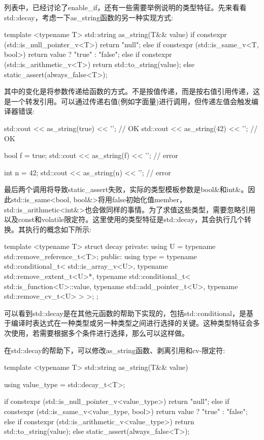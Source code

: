 列表中，已经讨论了enable\_if，还有一些需要举例说明的类型特征。先来看看std::decay，考虑一下as\_string函数的另一种实现方式:

\begin{cpp}
template <typename T>
std::string as_string(T&& value)
{
	if constexpr (std::is_null_pointer_v<T>)
		return "null";
	else if constexpr (std::is_same_v<T, bool>)
		return value ? "true" : "false";
	else if constexpr (std::is_arithmetic_v<T>)
		return std::to_string(value);
	else
		static_assert(always_false<T>);
}
\end{cpp}

其中的变化是将参数传递给函数的方式。不是按值传递，而是按右值引用传递，这是一个转发引用。可以通过传递右值(例如字面量)进行调用，但传递左值会触发编译器错误:

\begin{cpp}
std::cout << as_string(true) << '\n'; // OK
std::cout << as_string(42) << '\n'; // OK

bool f = true;
std::cout << as_string(f) << '\n'; // error

int n = 42;
std::cout << as_string(n) << '\n'; // error
\end{cpp}

最后两个调用将导致static\_assert失败，实际的类型模板参数是bool\&和int\&。因此std::is\_same<bool, bool\&>将用false初始化值member，std::is\_arithmetic<int\&>也会做同样的事情。为了求值这些类型，需要忽略引用以及const和volatile限定符。这里使用的类型特征是std::decay，其会执行几个转换。其执行的概念如下所示:

\begin{cpp}
template <typename T>
struct decay
{
private:
	using U = typename std::remove_reference_t<T>;
public:
	using type = typename std::conditional_t<
		std::is_array_v<U>,
		typename std::remove_extent_t<U>*,
		typename std::conditional_t<
			std::is_function<U>::value,
			typename std::add_pointer_t<U>,
			typename std::remove_cv_t<U>
		>
	>;
};
\end{cpp}

可以看到std::decay是在其他元函数的帮助下实现的，包括std::conditional，是基于编译时表达式在一种类型或另一种类型之间进行选择的关键。这种类型特征会多次使用，若需要根据多个条件进行选择，那么可以这样做。

在std::decay的帮助下，可以修改as\_string函数、剥离引用和cv-限定符:

\begin{cpp}
template <typename T>
std::string as_string(T&& value)
{
	using value_type = std::decay_t<T>;
	
	if constexpr (std::is_null_pointer_v<value_type>)
		return "null";
	else if constexpr (std::is_same_v<value_type, bool>)
		return value ? "true" : "false";
	else if constexpr (std::is_arithmetic_v<value_type>)
		return std::to_string(value);
	else
		static_assert(always_false<T>);
}
\end{cpp}

